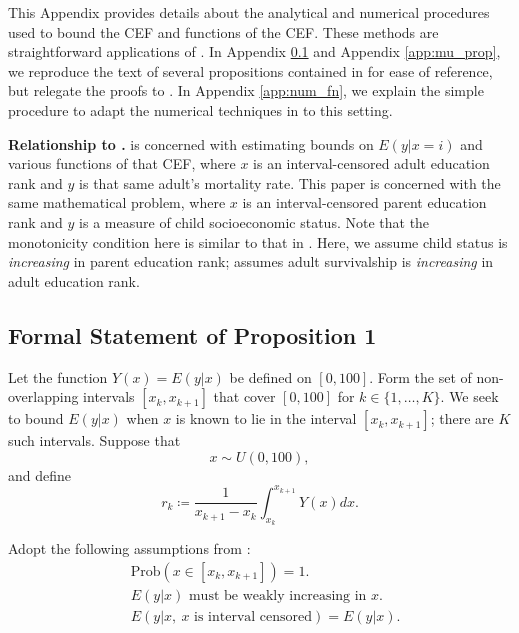This Appendix provides details about the analytical and numerical
procedures used to bound the CEF and functions of the CEF. These methods
are straightforward applications of . In
Appendix \ref{app:cef_prop} and Appendix \ref{app:mu_prop}, we 
reproduce the text of several propositions contained in
 for ease of
reference, but relegate the proofs to . In Appendix
\ref{app:num_fn}, we explain the simple
procedure to adapt the numerical techniques in
 to this setting. 

\textbf{Relationship to .}  is
  concerned with estimating bounds on $E(y|x=i)$ and various functions
  of that CEF, where $x$ is an interval-censored adult education rank
  and $y$ is that same adult's mortality rate. This paper is concerned
  with the same mathematical problem, where $x$ is an
  interval-censored parent education rank and $y$ is a measure of
  child socioeconomic status. Note that the monotonicity condition
  here is similar to that in . Here, we
  assume child status is \textit{increasing} in parent education
  rank;  assumes adult survivalship is
  \textit{increasing} in adult education rank. 

\subsection{Formal Statement of Proposition 1} 
\label{app:cef_prop}   
Let the function $Y(x) = E(y|x)$ be defined on $[0,100]$. Form the set
of non-overlapping intervals $[x_k, x_{k+1}]$ that cover $[0,100]$ for
$k \in \{1, \dots, K\}$. We
seek to bound $E(y|x)$ when
$x$ is known to lie in the interval $[x_k,x_{k+1}]$; there are $K$
such intervals. Suppose that 
\begin{equation}
x \sim U(0,100),
  \tag{Assumption U} 
\end{equation}
and define $$ r_k \coloneqq \frac{1}{x_{k+1} - x_k} \int_{x_k}^{x_{k+1}}
Y(x)dx.$$ 

Adopt the following assumptions from : 
\begin{align*}
 \tag{Assumption I} 
  &\text{Prob}(x \in [x_{k}, x_{k+1}]) = 1. \\
  \tag{Assumption M}  
  &E(y|x) \text{ must be weakly increasing in } x. \\ 
  \tag{Assumption MI} 
  &E( y \vert x, \ x \text{ is interval censored}) = E(y
  \vert x). \\
\end{align*}

